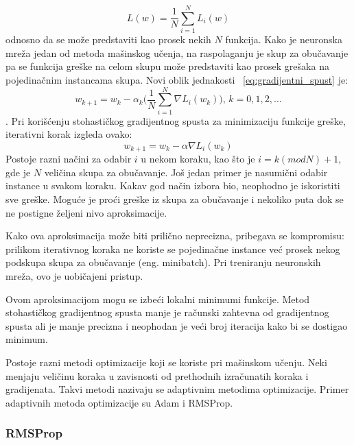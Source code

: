 \begin{equation}
		L(w) = \frac{1}{N}\sum_{i=1}^{N} L_i(w)	
\end{equation}
odnosno da se može predstaviti kao prosek nekih $N$ funkcija. Kako je neuronska mreža jedan od metoda mašinskog učenja, na raspolaganju je skup za obučavanje pa se funkcija greške na celom skupu može predstaviti kao prosek grešaka na pojedinačnim instancama skupa. Novi oblik 
jednakosti ~\eqref{eq:gradijentni_spust} je:
\begin{equation}
	w_{k+1} = w_k - \alpha_k \bigg( \frac{1}{N}\sum_{i=1}^{N} \nabla L_i(w_k) \bigg)\text{,~} k=0,1,2, ... 
\end{equation}.
Pri korišćenju stohastičkog gradijentnog spusta za minimizaciju funkcije greške, iterativni korak izgleda ovako:
\begin{equation}
	w_{k+1} = w_k - \alpha \nabla L_i(w_k) 
\end{equation}
Postoje razni načini za odabir $i$ u nekom koraku, kao što je $i=k (mod N) + 1$, gde je $N$ veličina skupa za obučavanje. Još jedan primer je nasumični odabir instance u svakom koraku. Kakav god način izbora bio, neophodno je iskoristiti sve greške. Moguće je proći greške iz skupa za obučavanje i nekoliko puta dok se ne postigne željeni nivo aproksimacije. 
\par
Kako ova aproksimacija može biti prilično neprecizna, pribegava se kompromisu: prilikom iterativnog koraka ne koriste se pojedinačne instance već prosek nekog podskupa skupa za obučavanje (eng. minibatch). Pri treniranju neuronskih mreža, ovo je uobičajeni pristup.
\par
Ovom aproksimacijom mogu se izbeći lokalni minimumi funkcije. Metod stohastičkog gradijentnog spusta manje je računski zahtevna od gradijentnog spusta ali je manje precizna i neophodan je veći broj iteracija kako bi se dostigao minimum.
\par
Postoje razni metodi optimizacije koji se koriste pri mašinskom učenju. Neki menjaju veličinu koraka u zavisnosti od prethodnih izračunatih koraka i gradijenata. Takvi metodi nazivaju se adaptivnim metodima optimizacije. Primer adaptivnih metoda optimizacije su Adam i RMSProp.

\subsubsection{RMSProp}

